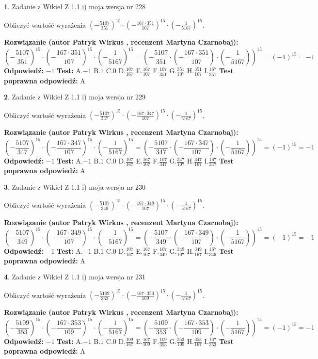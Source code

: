 \documentclass[12pt, a4paper]{article}
\theoremstyle{definition} %
\newtheorem{zad}{}
\newcommand{\zadStart}[1]{\begin{zad}#1\newline}
\newcommand{\zadStop}{\end{zad}}
\newcommand{\rozwStart}[2]{\noindent \textbf{Rozwiązanie (autor #1 , recenzent #2): }\newline}
\newcommand{\rozwStop}{\newline}
\newcommand{\odpStart}{\noindent \textbf{Odpowiedź:}\newline}
\newcommand{\odpStop}{\newline}
\newcommand{\testStart}{\noindent \textbf{Test:}\newline}
\newcommand{\testStop}{\newline}
\newcommand{\kluczStart}{\noindent \textbf{Test poprawna odpowiedź:}\newline}
\newcommand{\kluczStop}{\newline}
\begin{document}
\zadStart{Zadanie z Wikieł Z 1.1 i) moja wersja nr 228}

Obliczyć wartość wyrażenia $(-\frac{5107}{351})^{15} \cdot (-\frac{167 \cdot 351}{107})^{15} \cdot (-\frac{1}{5167})^{15}$.
\zadStop
\rozwStart{Patryk Wirkus}{Martyna Czarnobaj}
$$(-\frac{5107}{351})^{15} \cdot (-\frac{167 \cdot 351}{107})^{15} \cdot (-\frac{1}{5167})^{15} = (-\frac{5107}{351} \cdot (-\frac{167 \cdot 351}{107}) \cdot (-\frac{1}{5167}))^{15} = (-1)^{15} = -1$$
\rozwStop
\odpStart
$-1$
\odpStop
\testStart
A.$-1$ B.$1$ C.$0$ D.$\frac{107}{167}$ E.$\frac{167}{107}$
F.$\frac{107}{351}$ G.$\frac{351}{107}$
H.$\frac{351}{167}$
I.$\frac{167}{351}$
\testStop
\kluczStart
A
\kluczStop



\zadStart{Zadanie z Wikieł Z 1.1 i) moja wersja nr 229}

Obliczyć wartość wyrażenia $(-\frac{5107}{347})^{15} \cdot (-\frac{167 \cdot 347}{107})^{15} \cdot (-\frac{1}{5167})^{15}$.
\zadStop
\rozwStart{Patryk Wirkus}{Martyna Czarnobaj}
$$(-\frac{5107}{347})^{15} \cdot (-\frac{167 \cdot 347}{107})^{15} \cdot (-\frac{1}{5167})^{15} = (-\frac{5107}{347} \cdot (-\frac{167 \cdot 347}{107}) \cdot (-\frac{1}{5167}))^{15} = (-1)^{15} = -1$$
\rozwStop
\odpStart
$-1$
\odpStop
\testStart
A.$-1$ B.$1$ C.$0$ D.$\frac{107}{167}$ E.$\frac{167}{107}$
F.$\frac{107}{347}$ G.$\frac{347}{107}$
H.$\frac{347}{167}$
I.$\frac{167}{347}$
\testStop
\kluczStart
A
\kluczStop



\zadStart{Zadanie z Wikieł Z 1.1 i) moja wersja nr 230}

Obliczyć wartość wyrażenia $(-\frac{5107}{349})^{15} \cdot (-\frac{167 \cdot 349}{107})^{15} \cdot (-\frac{1}{5167})^{15}$.
\zadStop
\rozwStart{Patryk Wirkus}{Martyna Czarnobaj}
$$(-\frac{5107}{349})^{15} \cdot (-\frac{167 \cdot 349}{107})^{15} \cdot (-\frac{1}{5167})^{15} = (-\frac{5107}{349} \cdot (-\frac{167 \cdot 349}{107}) \cdot (-\frac{1}{5167}))^{15} = (-1)^{15} = -1$$
\rozwStop
\odpStart
$-1$
\odpStop
\testStart
A.$-1$ B.$1$ C.$0$ D.$\frac{107}{167}$ E.$\frac{167}{107}$
F.$\frac{107}{349}$ G.$\frac{349}{107}$
H.$\frac{349}{167}$
I.$\frac{167}{349}$
\testStop
\kluczStart
A
\kluczStop



\zadStart{Zadanie z Wikieł Z 1.1 i) moja wersja nr 231}

Obliczyć wartość wyrażenia $(-\frac{5109}{353})^{15} \cdot (-\frac{167 \cdot 353}{109})^{15} \cdot (-\frac{1}{5167})^{15}$.
\zadStop
\rozwStart{Patryk Wirkus}{Martyna Czarnobaj}
$$(-\frac{5109}{353})^{15} \cdot (-\frac{167 \cdot 353}{109})^{15} \cdot (-\frac{1}{5167})^{15} = (-\frac{5109}{353} \cdot (-\frac{167 \cdot 353}{109}) \cdot (-\frac{1}{5167}))^{15} = (-1)^{15} = -1$$
\rozwStop
\odpStart
$-1$
\odpStop
\testStart
A.$-1$ B.$1$ C.$0$ D.$\frac{109}{167}$ E.$\frac{167}{109}$
F.$\frac{109}{353}$ G.$\frac{353}{109}$
H.$\frac{353}{167}$
I.$\frac{167}{353}$
\testStop
\kluczStart
A
\kluczStop
\end{document}
